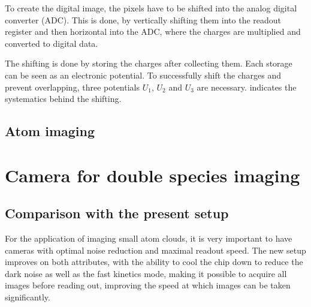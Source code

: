 	To create the digital image, the pixels have to be shifted into the analog digital converter (ADC). This is done, by vertically shifting them into the readout register and then horizontal into the ADC, where the charges are multiplied and converted to digital data.
	
	
	The shifting is done by storing the charges after collecting them. Each storage can be seen as an electronic potential. To successfully shift the charges and prevent overlapping, three potentials $U_1$, $U_2$ and $U_3$ are necessary.  indicates the systematics behind the shifting.
	
	
\subsection{Atom imaging} 

\section{Camera for double species imaging}
\label{ch:camera}

\subsection{Comparison with the present setup}
For the application of imaging small atom clouds, it is very important to have cameras with optimal noise reduction and maximal readout speed. The new setup improves on both attributes, with the ability to cool the chip down to reduce the dark noise as well as the fast kinetics mode, making it possible to acquire all images before reading out, improving the speed at which images can be taken significantly.

